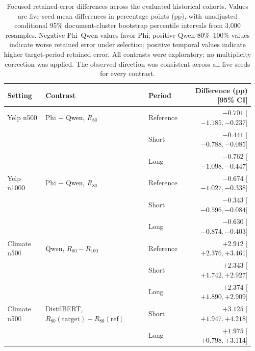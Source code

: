 \begin{table}[t]
\centering
\footnotesize
\caption{Focused retained-error differences across the evaluated historical cohorts. Values are five-seed mean differences in percentage points (pp), with unadjusted conditional 95\% document-cluster bootstrap percentile intervals from 3,000 resamples. Negative Phi--Qwen values favor Phi; positive Qwen 80\%--100\% values indicate worse retained error under selection; positive temporal values indicate higher target-period retained error. All contrasts were exploratory; no multiplicity correction was applied. The observed direction was consistent across all five seeds for every contrast.}
\label{tab:rq2-bootstrap-contrasts}
\begin{tabular}{lllr}
\toprule
\textbf{Setting} & \textbf{Contrast} & \textbf{Period} & \textbf{Difference (pp) [95\% CI]} \\
\midrule
Yelp n500 & Phi $-$ Qwen, $R_{80}$ & Reference & $-0.701$ [$-1.185, -0.237$] \\
 &  & Short & $-0.441$ [$-0.788, -0.085$] \\
 &  & Long & $-0.762$ [$-1.098, -0.447$] \\
\midrule
Yelp n1000 & Phi $-$ Qwen, $R_{80}$ & Reference & $-0.674$ [$-1.027, -0.338$] \\
 &  & Short & $-0.343$ [$-0.596, -0.084$] \\
 &  & Long & $-0.630$ [$-0.874, -0.403$] \\
\midrule
Climate n500 & Qwen, $R_{80} - R_{100}$ & Reference & $+2.912$ [$+2.376, +3.461$] \\
 &  & Short & $+2.343$ [$+1.742, +2.927$] \\
 &  & Long & $+2.374$ [$+1.890, +2.909$] \\
\midrule
Climate n500 & DistilBERT, $R_{80}(\mathrm{target}) - R_{80}(\mathrm{ref})$ & Short & $+3.125$ [$+1.947, +4.218$] \\
 &  & Long & $+1.975$ [$+0.798, +3.114$] \\
\bottomrule
\end{tabular}
\end{table}

